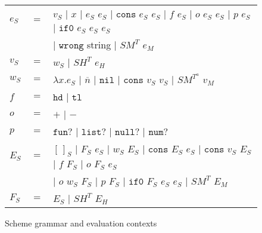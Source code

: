 \begin{figure}[p]
\centering
\begin{tabular}{lcl}
$e_{S}$ & $=$ & $v_{S}$ $\vert$ $x$ $\vert$ $e_{S}$ $e_{S}$ $\vert$ $\mathtt{cons}$ $e_{S}$ $e_{S}$ $\vert$ $f$ $e_{S}$ $\vert$ $o$ $e_{S}$ $e_{S}$ $\vert$ $p$ $e_{S}$ $\vert$ $\mathtt{if0}$ $e_{S}$ $e_{S}$ $e_{S}$ \\
&& $\vert$ $\mathtt{wrong}$ string $\vert$ $SM^{T}$ $e_{M}$ \\
$v_{S}$ & $=$ & $w_{S}$ $\vert$ $SH^{T}$ $e_{H}$ \\
$w_{S}$ & $=$ & $\lambda x.e_{S}$ $\vert$ $\overline{n}$ $\vert$ $\mathtt{nil}$ $\vert$ $\mathtt{cons}$ $v_{S}$ $v_{S}$ $\vert$ $SM^{T^{a}}$ $v_{M}$ \\
$f$ & $=$ & $\mathtt{hd}$ $\vert$ $\mathtt{tl}$ \\
$o$ & $=$ & $+$ $\vert$ $-$ \\
$p$ & $=$ & $\mathtt{fun?}$ $\vert$ $\mathtt{list?}$ $\vert$ $\mathtt{null?}$ $\vert$ $\mathtt{num?}$ \\
$E_{S}$ & $=$ & $[\,]_{S}$ $\vert$ $F_{S}$ $e_{S}$ $\vert$ $w_{S}$ $E_{S}$ $\vert$ $\mathtt{cons}$ $E_{S}$ $e_{S}$ $\vert$ $\mathtt{cons}$ $v_{S}$ $E_{S}$ $\vert$ $f$ $F_{S}$ $\vert$ $o$ $F_{S}$ $e_{S}$ \\
&& $\vert$ $o$ $w_{S}$ $F_{S}$ $\vert$ $p$ $F_{S}$ $\vert$ $\mathtt{if0}$ $F_{S}$ $e_{S}$ $e_{S}$ $\vert$ $SM^{T}$ $E_{M}$ \\
$F_{S}$ & $=$ & $E_{S}$ $\vert$ $SH^{T}$ $E_{H}$
\end{tabular}
\caption{Scheme grammar and evaluation contexts}
\label{sg}
\end{figure}